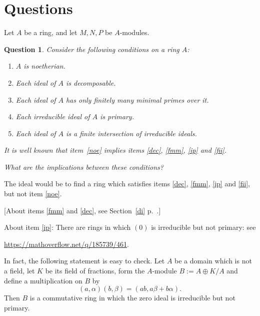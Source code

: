 \documentclass[parskip=half,fontsize=12pt]{scrartcl}%
\newtheorem{qn}[thm]{Question}
\begin{document}
\section{Questions}%

Let $A$ be a ring, and let $M,N,P$ be $A$-modules.



\begin{qn}
Consider the following conditions on a ring $A$:

\begin{enumerate}
\item\label{noe} $A$ is noetherian.
\item\label{dec} Each ideal of $A$ is decomposable.
\item\label{fmm} Each ideal of $A$ has only finitely many minimal primes over it.
\item\label{ip} Each irreducible ideal of $A$ is primary.
\item\label{fii} Each ideal of $A$ is a finite intersection of irreducible ideals.
\end{enumerate}

It is well known that item~\ref{noe} implies items \ref{dec}, \ref{fmm}, \ref{ip} and \ref{fii}.%

What are the implications between these conditions?
\end{qn}

The ideal would be to find a ring which satisfies items \ref{dec}, \ref{fmm}, \ref{ip} and \ref{fii}, but not item \ref{noe}.%

[About items \ref{fmm} and \ref{dec}, see Section~\ref{di} p.~\pageref{di}.]

About item \ref{ip}: There are rings in which $(0)$ is irreducible but not primary: see 

\href{https://mathoverflow.net/q/185739/461}{https://mathoverflow.net/q/185739/461}. 

In fact, the following statement is easy to check. Let $A$ be a domain which is not a field, let $K$ be its field of fractions, form the $A$-module $B:=A\oplus K/A$ and define a multiplication on $B$ by $$(a,\alpha)(b,\beta)=(ab,a\beta+b\alpha).$$ Then $B$ is a commutative ring in which the zero ideal is irreducible but not primary. 
\end{document}
